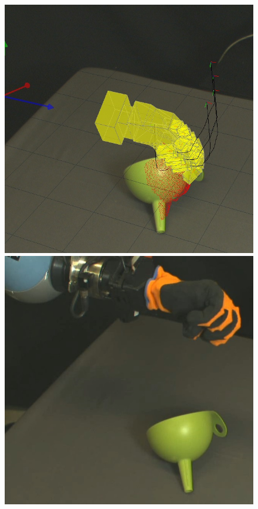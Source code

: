\begin{figure}
\begin{center}
  \includegraphics[width=\tw]{images/experiments/query/funnellarge-1-s} \hspace{-6pt}
 \includegraphics[width=\tw]{images/experiments/exec/funnellarge-s}\\ [1ex]

\end{center}
\end{figure}

